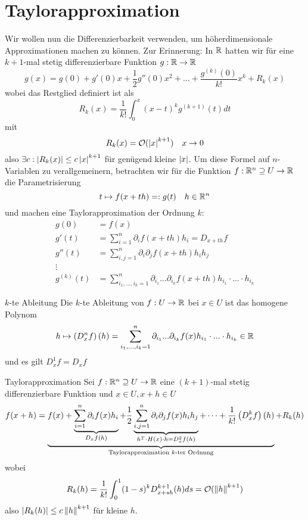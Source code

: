 \section{Taylorapproximation}
Wir wollen nun die Differenzierbarkeit verwenden, um höherdimensionale Approximationen machen zu können. Zur Erinnerung: In $\mathbb{R}$ hatten wir für eine $k+1$-mal stetig differenzierbare Funktion $g: \mathbb{R} \to \mathbb{R}$
$$g(x)=g(0) + g'(0)x + \frac{1}{2}g''(0)x^2 + ... + \frac{g^{(k)}(0)}{k!}x^k + R_k(x)$$
wobei das Restglied definiert ist als
$$R_k(x) = \frac{1}{k!}\int_0^x(x-t)^kg^{(k+1)}(t)dt$$
mit
$$R_k(x) = \mathcal{O}(\left|x\right|^{k+1}) \quad x \to 0$$
also $\exists c: \left|R_k(x)\right| \leq c\left|x\right|^{k+1}$ für genügend kleine $\left|x\right|$. Um diese Formel auf $n$-Variablen zu verallgemeinern, betrachten wir für die Funktion $f: \mathbb{R}^n \supseteq U \to \mathbb{R}$ die Parametrisierung
$$t \mapsto f(x+th) =: g(t) \quad h \in \mathbb{R}^n$$
und machen eine Taylorapproximation der Ordnung $k$:
\begin{align*}
    g(0) &= f(x)\\
    g'(t) &= \sum_{i=1}^n \partial_i f(x+th) h_i = D_{x+th}f\\
    g''(t) &= \sum_{i,j=1}^n \partial_i  \partial_j f(x+th)h_i h_j\\
    \vdots\\
    g^{(k)}(t)&=\sum_{i_1,...,i_k=1}^n  \partial_{i_1} ... \partial_{i_k}  f(x+th) h_{i_1}\cdot...\cdot h_{i_k}
\end{align*}
\begin{definition}{$k$-te Ableitung}{}
Die $k$-te Ableitung von $f: U \to \mathbb{R}$ bei $x \in U$ ist das homogene Polynom
$$h \mapsto \left(D^n_xf\right)(h) = \sum_{i_1,...,i_k=1}^n  \partial_{i_1} ... \partial_{i_k}  f(x) h_{i_1}\cdot...\cdot h_{i_k} \in \mathbb{R}$$
und es gilt $D^1_x f = D_xf$
\end{definition}
\begin{satz}{Taylorapproximation}{}
Sei $f: \mathbb{R}^n \supseteq U \to \mathbb{R}$ eine $(k+1)$-mal stetig differenzierbare Funktion und $x \in U, x+h \in U$
\begin{align*}
    f(x+h) =\underbrace{f(x) + \underbrace{\sum_{i=1}^n \partial_i f(x) h_i}_{D_{x}f (h)} + \frac{1}{2}\underbrace{\sum_{i,j=1}^n \partial_i  \partial_j f(x)h_i h_j}_{h^T \cdot H(x)\cdot h = D^2_xf(h)}+\cdots+ \frac{1}{k!}\left(D^k_xf\right)(h)}_{\text{Taylorapproximation $k$-ter Ordnung}} + R_k(h)
\end{align*}
wobei
$$R_k(h) = \frac{1}{k!}\int_0^1(1-s)^k D^{k+1}_{x+sh}(h) ds = \mathcal{O}(\left\|h\right\|^{k+1})$$
also $\left|R_k(h)\right| \leq c \left\|h\right\|^{k+1}$ für kleine $h$.
\end{satz}
